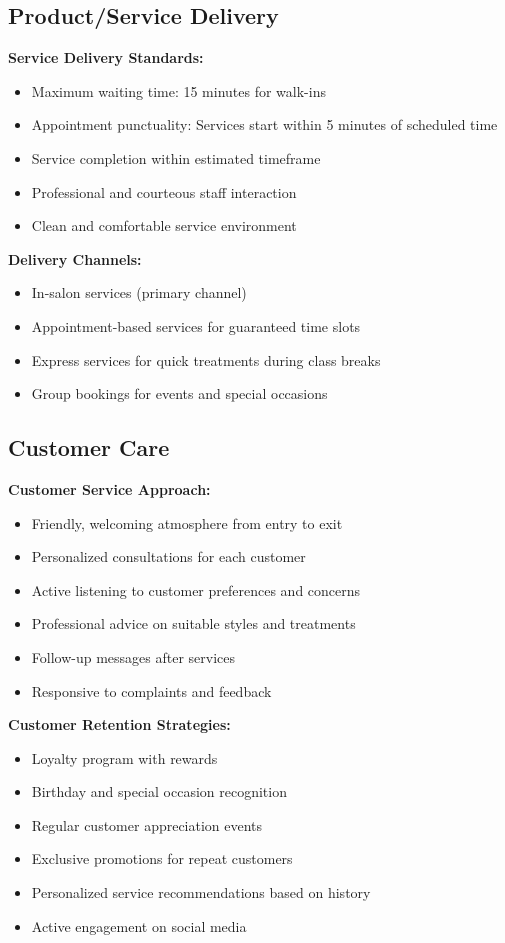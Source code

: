 \subsection{Product/Service Delivery}

\textbf{Service Delivery Standards:}
\begin{itemize}[leftmargin=2em]
    \item Maximum waiting time: 15 minutes for walk-ins
    \item Appointment punctuality: Services start within 5 minutes of scheduled time
    \item Service completion within estimated timeframe
    \item Professional and courteous staff interaction
    \item Clean and comfortable service environment
\end{itemize}

\textbf{Delivery Channels:}
\begin{itemize}[leftmargin=2em]
    \item In-salon services (primary channel)
    \item Appointment-based services for guaranteed time slots
    \item Express services for quick treatments during class breaks
    \item Group bookings for events and special occasions
\end{itemize}

\subsection{Customer Care}

\textbf{Customer Service Approach:}
\begin{itemize}[leftmargin=2em]
    \item Friendly, welcoming atmosphere from entry to exit
    \item Personalized consultations for each customer
    \item Active listening to customer preferences and concerns
    \item Professional advice on suitable styles and treatments
    \item Follow-up messages after services
    \item Responsive to complaints and feedback
\end{itemize}

\textbf{Customer Retention Strategies:}
\begin{itemize}[leftmargin=2em]
    \item Loyalty program with rewards
    \item Birthday and special occasion recognition
    \item Regular customer appreciation events
    \item Exclusive promotions for repeat customers
    \item Personalized service recommendations based on history
    \item Active engagement on social media
\end{itemize}

